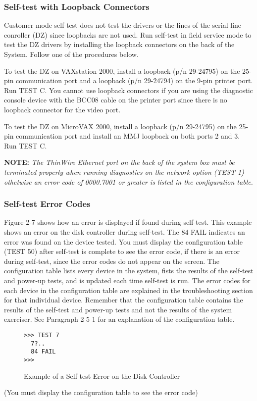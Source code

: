 \documentclass{decsectional}
\begin{document}
\subsubsection{Self-test with Loopback Connectors}

Customer mode self-test does not test the drivers or the lines of the serial
line conroller (DZ) since loopbacks are not used. Run self-test in field 
service mode to test the DZ drivers by installing the loopback connectors on
the back of the System. Follow one of the procedures below.

To test the DZ on VAXstation 2000, install a loopback (p/n 29-24795) on
the 25-pin communication port and a loopback (p/n 29-24794) on the 9-pin
printer port. Run TEST C. You cannot use loopback connectors if you are
using the diagnostic console device with the BCC08 cable on the printer
port since there is no loopback connector for the video port.

To test the DZ on MicroVAX 2000, install a loopback (p/n 29-24795) on the
25-pin communication port and install an MMJ loopback on both ports 2
and 3. Run TEST C.

\textbf{NOTE:} \textit{The ThinWire Ethernet port on the back of the 
system box must be terminated properly when running diagnostics on the 
network option (TEST 1) othetwise an error code of 0000.7001 or greater 
is listed in the configuration table.}

\subsubsection{Self-test Error Codes}

Figure 2-7 shows how an error is displayed if found during self-test. This
example shows an error on the disk controller during self-test. The 84 FAIL
indicates an error was found on the device tested. You must display the
configuration table (TEST 50) after self-test is complete to see the error code,
if there is an error during self-test, since the error codes do not appear on
the screen. The configuration table lists every device in the system, fists the
results of the self-test and power-up tests, and is updated each time self-test
is run. The error codes for each device in the configuration table are 
explained in the troubleshooting section for that individual device. Remember
that the configuration table contains the results of the self-test and power-up
tests and not the results of the system exerciser. See Paragraph 2 5 1 for an
explanation of the configuration table.

\begin{figure}[H]
\caption{Example of a Self-test Error on the Disk Controller}
\begin{verbatim}
>>> TEST 7
  7?..
  84 FAIL
>>>
\end{verbatim}
\end{figure}

(You must display the configuration table to see the error code)
\end{document}
